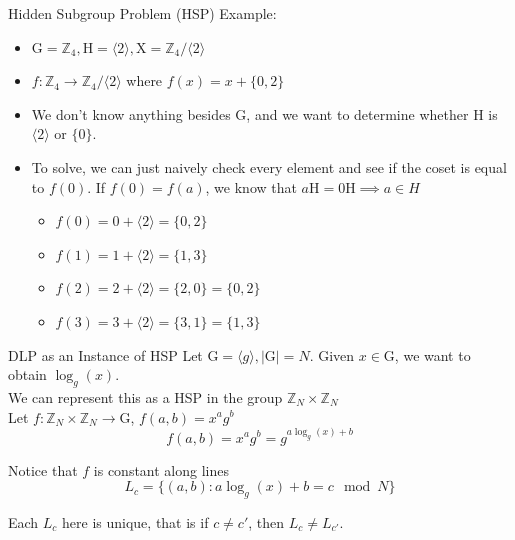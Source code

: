\documentclass{beamer}
\begin{document}
\begin{frame}{Hidden Subgroup Problem (HSP)}
    Example: 
    \begin{itemize}
        \item $\mathrm{G} = \mathbb{Z}_4, \mathrm{H} = \langle2\rangle, \mathrm{X} = \mathbb{Z}_4/\langle2\rangle$
        \item $f:\mathbb{Z}_4 \rightarrow \mathbb{Z}_4/\langle2\rangle$ where $ f(x) = x+ \{0, 2\}$
        \item We don't know anything besides $\mathrm{G}$, and we want to determine whether $\mathrm{H}$ is $\langle2\rangle$ or $\{0\}$.
        \item To solve, we can just naively check every element and see if the coset is equal to $f(0)$. If $f(0) = f(a)$, we know that $a\mathrm{H} = 0\mathrm{H} \implies a \in H$
        \begin{itemize}
            \item $f(0) = 0+\langle2\rangle = \{0, 2\}$
            \item $f(1) = 1+\langle2\rangle = \{1, 3\}$
            \item $f(2) = 2+\langle2\rangle = \{2, 0\} = \{0, 2\}$
            \item $f(3) = 3+\langle2\rangle = \{3, 1\} = \{1, 3\}$
        \end{itemize}
    \end{itemize}
    
\end{frame}

\begin{frame}{DLP as an Instance of HSP}
    Let $\mathrm{G} = \langle g\rangle, |\mathrm{G}| = N$. Given $x \in \mathrm{G}$, we want to obtain $\log_{g}(x)$.
    \\[10pt]
    We can represent this as a HSP in the group $\mathbb{Z}_N \times \mathbb{Z}_N$
    \\[10pt]
    Let $f:\mathbb{Z}_N \times \mathbb{Z}_N \rightarrow \mathrm{G}$, $f(a, b) = x^a g^b$
    \[
        f(a,b) = x^a g^b = g^{a \log_g(x) + b}
    \]
    
    Notice that $f$ is constant along lines 
    \[
        L_c = \{(a,b):a \log_g(x) + b = c \mod N \} 
    \]

    Each $L_c$ here is unique, that is if $c \neq c'$, then $L_c \neq L_{c'}$.


\end{frame}
\end{document}
